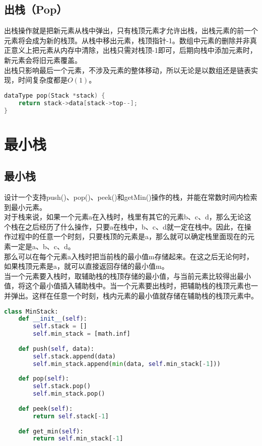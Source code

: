 \subsection{出栈（Pop）}

出栈操作就是把新元素从栈中弹出，只有栈顶元素才允许出栈，出栈元素的前一个元素将会成为新的栈顶。从栈中移出元素，栈顶指针-1。数组中元素的删除并非真正意义上把元素从内存中清除，出栈只需对栈顶-1即可，后期向栈中添加元素时，新元素会将旧元素覆盖。\\

出栈只影响最后一个元素，不涉及元素的整体移动，所以无论是以数组还是链表实现，时间复杂度都是$ O(1) $。\\


\begin{lstlisting}[language=C]
dataType pop(Stack *stack) {
    return stack->data[stack->top--];
}
\end{lstlisting}

\newpage

\section{最小栈}

\subsection{最小栈}

设计一个支持push()、pop()、peek()和getMin()操作的栈，并能在常数时间内检索到最小元素。\\

对于栈来说，如果一个元素a在入栈时，栈里有其它的元素b、c、d，那么无论这个栈在之后经历了什么操作，只要a在栈中，b、c、d就一定在栈中。因此，在操作过程中的任意一个时刻，只要栈顶的元素是a，那么就可以确定栈里面现在的元素一定是a、b、c、d。\\

那么可以在每个元素a入栈时把当前栈的最小值m存储起来。在这之后无论何时，如果栈顶元素是a，就可以直接返回存储的最小值m。\\

当一个元素要入栈时，取辅助栈的栈顶存储的最小值，与当前元素比较得出最小值，将这个最小值插入辅助栈中。当一个元素要出栈时，把辅助栈的栈顶元素也一并弹出。这样在任意一个时刻，栈内元素的最小值就存储在辅助栈的栈顶元素中。\\


\begin{lstlisting}[language=Python]
class MinStack:
    def __init__(self):
        self.stack = []
        self.min_stack = [math.inf]
    
    def push(self, data):
        self.stack.append(data)
        self.min_stack.append(min(data, self.min_stack[-1]))
    
    def pop(self):
        self.stack.pop()
        self.min_stack.pop()
    
    def peek(self):
        return self.stack[-1]
    
    def get_min(self):
        return self.min_stack[-1]
\end{lstlisting}

